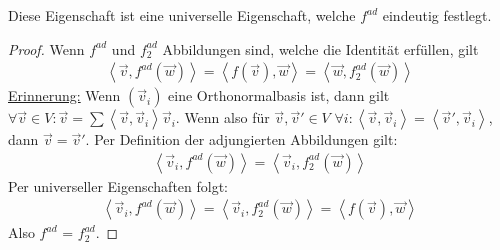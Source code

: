 \documentclass{report}
\newcommand{\ul}[1]{\underline{#1}}
\newcommand{\vv}{\vec{v}}
\newcommand{\vw}{\vec{w}}
\newcommand{\scalar}[2]{\left\langle #1, #2 \right\rangle}
\begin{document}
\begin{proposition}
 Diese Eigenschaft ist eine universelle Eigenschaft, welche $f^{ad}$ eindeutig festlegt.
\end{proposition}
\begin{proof}
 Wenn $f^{ad}$ und $f^{ad}_2$ Abbildungen sind, welche die Identität erfüllen, gilt 
 \begin{align*}
  \scalar{\vv}{f^{ad}(\vw)} = \scalar{f(\vv)}{\vw} = \scalar{\vw}{f^{ad}_2(\vw)}
 \end{align*}
 \ul{Erinnerung:} Wenn $(\vv_i)$ eine Orthonormalbasis ist, dann gilt $\forall \vv \in V : \vv = \sum \scalar{\vv}{\vv_i} \vv_i$. Wenn also für $\vv, \vv' \in V$ $\forall i : \scalar{\vv}{\vv_i} = \scalar{\vv'}{\vv_i}$, dann $\vv = \vv'$. Per Definition der adjungierten Abbildungen gilt:
 \begin{align*}
  \scalar{\vv_i}{f^{ad}(\vw)} = \scalar{\vv_i}{f^{ad}_2(\vw)}
 \end{align*}
 Per universeller Eigenschaften folgt:
 \begin{align*}
  \scalar{\vv_i}{f^{ad}(\vw)} = \scalar{\vv_i}{f^{ad}_2(\vw)} = \scalar{f(\vv)}{\vw}
 \end{align*}
 Also $f^{ad}$ = $f^{ad}_2$.
\end{proof}
%
%
%
%
%
%
\clearpage
[...]
\clearpage
\end{document}
